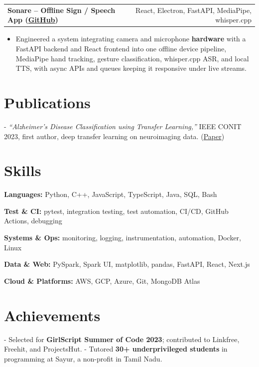 \documentclass[letterpaper,11pt]{article}
\makeatletter
\newcommand{\projItem}[2]{%
  \vspace{6pt}
  \begin{tabular*}{\textwidth}{@{}l@{\extracolsep{\fill}}r@{}}
    \textbf{#1} & #2 \\
  \end{tabular*}\par\vspace{-2pt}
}
\newcommand{\skillLine}[2]{\textbf{#1:} #2\par\vspace{2pt}}
\newcommand{\inlineBlock}[1]{{\setlength{\leftskip}{0.18in}\small #1\par}}
\makeatother
\begin{document}
\projItem{Sonare -- Offline Sign / Speech App {\normalfont\small(\href{https://github.com/Deva-1903/Qualcomm-Sep25-Team-Sonare}{GitHub})}}{React, Electron, FastAPI, MediaPipe, whisper.cpp}
\begin{itemize}
  \item Engineered a system integrating camera and microphone \textbf{hardware} with a FastAPI backend and React frontend into one offline device pipeline, MediaPipe hand tracking, gesture classification, whisper.cpp ASR, and local TTS, with async APIs and queues keeping it responsive under live streams.
\end{itemize}

\section{Publications}
\inlineBlock{- \textit{``Alzheimer's Disease Classification using Transfer Learning,''} IEEE CONIT 2023, first author, deep transfer learning on neuroimaging data. {\normalfont\small(\href{https://ieeexplore.ieee.org/document/10205760}{Paper})}}

\section{Skills}
\skillLine{Languages}{Python, C++, JavaScript, TypeScript, Java, SQL, Bash}
\skillLine{Test \& CI}{pytest, integration testing, test automation, CI/CD, GitHub Actions, debugging}
\skillLine{Systems \& Ops}{monitoring, logging, instrumentation, automation, Docker, Linux}
\skillLine{Data \& Web}{PySpark, Spark UI, matplotlib, pandas, FastAPI, React, Next.js}
\skillLine{Cloud \& Platforms}{AWS, GCP, Azure, Git, MongoDB Atlas}

\section{Achievements}
\inlineBlock{- Selected for \textbf{GirlScript Summer of Code 2023}; contributed to Linkfree, Freehit, and ProjectsHut. - Tutored \textbf{30+ underprivileged students} in programming at Sayur, a non-profit in Tamil Nadu.}
\end{document}
